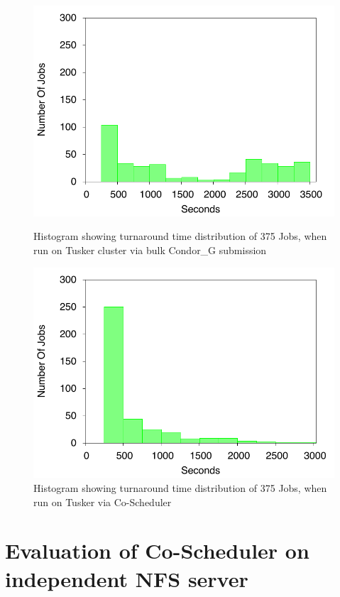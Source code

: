 \documentclass[ms,electronic,double]{nuthesis}
\begin{document}
\begin{figure}[h!]
\begin{center}
\includegraphics{images/tusker_histogram}
\caption{Histogram showing turnaround time distribution of 375 Jobs, when run on Tusker cluster via bulk Condor_G submission}
\label{fig:tusker_histogram}
\end{center}

\begin{center}
\includegraphics{images/coscheduler_histogram}
\caption{Histogram showing turnaround time distribution of 375 Jobs, when run on Tusker  via Co-Scheduler}
\label{fig:coscheduler_histogram}
\end{center}


\end{figure}
\FloatBarrier

\section{Evaluation of Co-Scheduler on independent NFS server}
\end{document}
